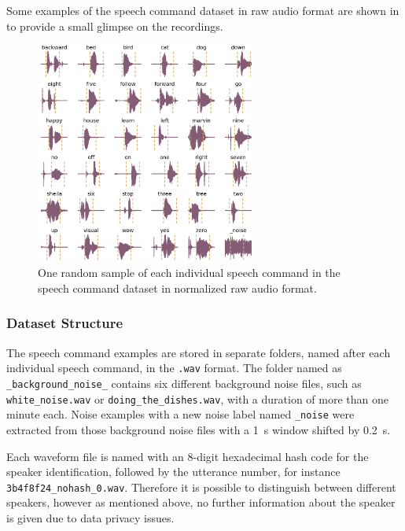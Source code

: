 Some examples of the speech command dataset in raw audio format are shown in  to provide a small glimpse on the recordings.
\begin{figure}[!ht]
  \centering
    \includegraphics[width=0.65\textwidth]{./5_exp/figs/exp_dataset_wav_grid_speech_commands_v2}
  \caption{One random sample of each individual speech command in the speech command dataset in normalized raw audio format.}
  \label{fig:exp_dataset_wav_grid_speech_commands_v2}
\end{figure}
\FloatBarrier
\noindent

\subsubsection{Dataset Structure}
The speech command examples are stored in separate folders, named after each individual speech command, in the \texttt{.wav} format.
The folder named as \texttt{\_background\_noise\_} contains six different background noise files, such as \texttt{white\_noise.wav} or \texttt{doing\_the\_dishes.wav}, with a duration of more than one minute each.
Noise examples with a new noise label named \texttt{\_noise} were extracted from those background noise files with a \SI{1}{\second} window shifted by \SI{0.2}{\second}.

Each waveform file is named with an 8-digit hexadecimal hash code for the speaker identification, followed by the utterance number, for instance \texttt{3b4f8f24\_nohash\_0.wav}.
Therefore it is possible to distinguish between different speakers, however as mentioned above, no further information about the speaker is given due to data privacy issues.

